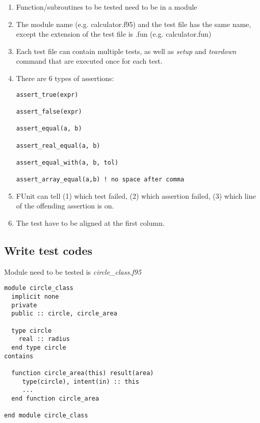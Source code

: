 \begin{enumerate}
\item Function/subroutines to be tested need to be in a module

\item The module name (e.g. calculator.f95) and the test file has the
  same name, except the extension of the test file is .fun
  (e.g. calculator.fun)

\item Each test file can contain multiple tests, as well as
  {\it setup} and {\it teardown} command that are executed once for
  each test.

\item There are 6 types of assertions:
\begin{verbatim}
assert_true(expr)

assert_false(expr)

assert_equal(a, b)

assert_real_equal(a, b)

assert_equal_with(a, b, tol)

assert_array_equal(a,b) ! no space after comma
\end{verbatim}

\item FUnit can tell (1) which test failed, (2) which assertion
  failed, (3) which line of the offending assertion is on.

\item The test have to be aligned at the first column.
\end{enumerate}

\subsection{Write test codes}
\label{sec:write-test-codes}

Module need to be tested is {\it circle\_class.f95}
\begin{lstlisting}
module circle_class
  implicit none
  private
  public :: circle, circle_area

  type circle
    real :: radius
  end type circle
contains

  function circle_area(this) result(area)
     type(circle), intent(in) :: this
     ...
  end function circle_area

end module circle_class
\end{lstlisting}

